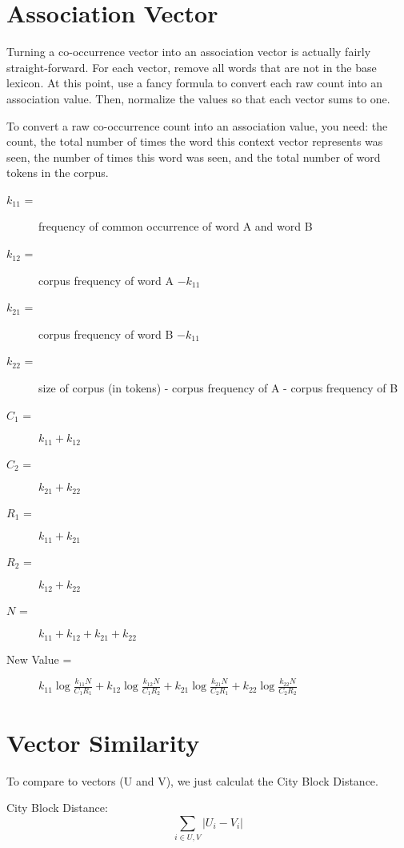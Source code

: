 \documentclass[12pt]{article}
\begin{document}
\section{Association Vector}

Turning a co-occurrence vector into an association vector is actually fairly
straight-forward. For each vector, remove all words that are not in the base
lexicon. At this point, use a fancy formula to convert each raw count into an
association value.  Then, normalize the values so that each vector sums to
one.

To convert a raw co-occurrence count into an association value, you need: the
count, the total number of times the word this context vector represents was
seen, the number of times this word was seen, and the total number of word
tokens in the corpus.

\begin{description}
\item[$k_{11}$ =] frequency of common occurrence of word A and word B
\item[$k_{12}$ =] corpus frequency of word A $- k_{11}$
\item[$k_{21}$ =] corpus frequency of word B $- k_{11}$
\item[$k_{22}$ =] size of corpus (in tokens) - corpus frequency of A - corpus frequency of B
\item[$C_1$ =] $k_{11} + k_{12}$
\item[$C_2$ =] $k_{21} + k_{22}$
\item[$R_1$ =] $k_{11} + k_{21}$
\item[$R_2$ =] $k_{12} + k_{22}$
\item[$N$ =] $k_{11} + k_{12} + k_{21} + k_{22}$
\item[New Value = ]
    $k_{11}\log\frac{k_{11}N}{C_1R_1} +
    k_{12}\log\frac{k_{12}N}{C_1R_2} +
    k_{21}\log\frac{k_{21}N}{C_2R_1} +
    k_{22}\log\frac{k_{22}N}{C_2R_2}$
\end{description}


\section{Vector Similarity}

To compare to vectors (U and V), we just calculat the City Block Distance.

City Block Distance:
$$\sum_{i\in U,V} |U_i - V_i| $$
\end{document}
